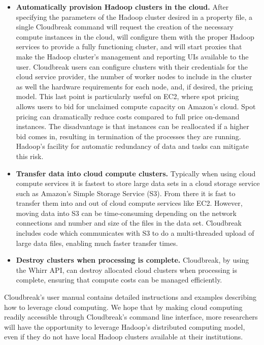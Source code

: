 \begin{itemize}
\item \textbf{Automatically provision Hadoop clusters in the cloud.} After specifying the parameters of the Hadoop cluster desired in a property file, a single Cloudbreak command will request the creation of the necessary compute instances in the cloud, will configure them with the proper Hadoop services to provide a fully functioning cluster, and will start proxies that make the Hadoop cluster's management and reporting UIs available to the user. Cloudbreak users can configure clusters with their credentials for the cloud service provider, the number of worker nodes to include in the cluster as well the hardware requirements for each node, and, if desired, the pricing model. This last point is particularly useful on EC2, where spot pricing allows users to bid for unclaimed compute capacity on Amazon's cloud. Spot pricing can dramatically reduce costs compared to full price on-demand instances. The disadvantage is that instances can be reallocated if a higher bid comes in, resulting in termination of the processes they are running. Hadoop's facility for automatic redundancy of data and tasks can mitigate this risk.

\item \textbf{Transfer data into cloud compute clusters.} Typically when using cloud compute services it is fastest to store large data sets in a cloud storage service such as Amazon's Simple Storage Service (S3). From there it is fast to transfer them into and out of cloud compute services like EC2. However, moving data into S3 can be time-consuming depending on the network connections and number and size of the files in the data set. Cloudbreak includes code which communicates with S3 to do a multi-threaded upload of large data files, enabling much faster transfer times.

\item \textbf{Destroy clusters when processing is complete.} Cloudbreak, by using the Whirr API, can destroy allocated cloud clusters when processing is complete, ensuring that compute costs can be managed efficiently.
\end{itemize}

Cloudbreak's user manual contains detailed instructions and examples describing how to leverage cloud computing. We hope that by making cloud computing readily accessible through Cloudbreak's command line interface, more researchers will have the opportunity to leverage Hadoop's distributed computing model, even if they do not have local Hadoop clusters available at their institutions.

